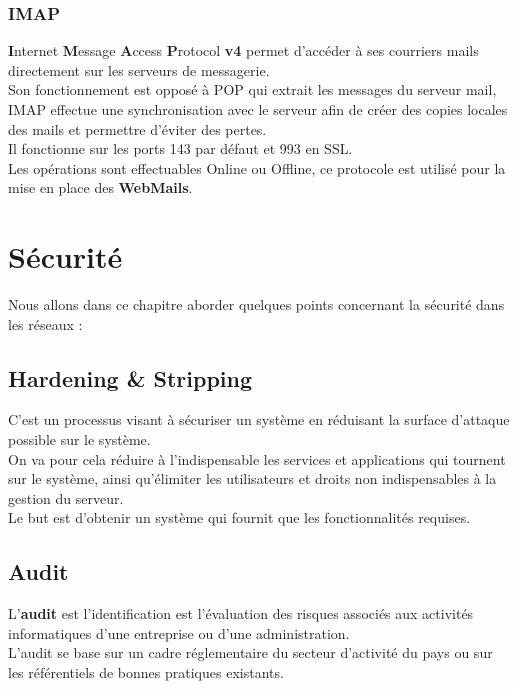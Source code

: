\documentclass{report}
\begin{document}
		\subsection{IMAP}

			\textbf{I}nternet \textbf{M}essage \textbf{A}ccess \textbf{P}rotocol \textbf{v4} permet d'accéder à ses courriers mails directement sur les serveurs de messagerie.\\
			Son fonctionnement est opposé à POP qui extrait les messages du serveur mail, IMAP effectue une synchronisation avec le serveur afin de créer des copies locales des mails et permettre d'éviter des pertes.\\

			Il fonctionne sur les ports 143 par défaut et 993 en SSL.\\

			Les opérations sont effectuables Online ou Offline, ce protocole est utilisé pour la mise en place des \textbf{WebMails}.\\

\chapter{Sécurité}

	Nous allons dans ce chapitre aborder quelques points concernant la sécurité dans les réseaux : \\

	\section{Hardening \& Stripping}

		C'est un processus visant à sécuriser un système en réduisant la surface d'attaque possible sur le système.\\
		On va pour cela réduire à l'indispensable les services et applications qui tournent sur le système, ainsi qu'élimiter les utilisateurs et droits non indispensables à la gestion du serveur.\\
		Le but est d'obtenir un système qui fournit que les fonctionnalités requises.\\

	\section{Audit}

		L'\textbf{audit} est l'identification est l'évaluation des risques associés aux activités informatiques d'une entreprise ou d'une administration.\\
		L'audit se base sur un cadre réglementaire du secteur d'activité du pays ou sur les référentiels de bonnes pratiques existants.\\
\end{document}
